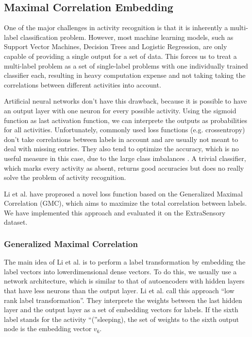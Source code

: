\subsection{Maximal Correlation Embedding}

One of the major challenges in activity recognition is that it is inherently a multi-label classification problem. However, most machine learning models, such as Support Vector Machines, Decision Trees and Logistic Regression, are only capable of providing a single output for a set of data. This forces us to treat a multi-label problem as a set of single-label problems with one individually trained classifier each, resulting in heavy computation expense and not taking taking the correlations between different activities into account.

Artificial neural networks don't have this drawback, because it is possible to have an output layer with one neuron for every possible activity. Using the sigmoid function as last activation function, we can interprete the outputs as probabilities for all activities. Unfortunately, commonly used loss functions (e.g. crossentropy) don't take correlations between labels in account and are usually not meant to deal with missing entries. They also tend to optimize the accuracy, which is no useful measure in this case, due to the large class imbalances \cite{Vaizman17}. A trivial classifier, which marks every activity as absent, returns good accuracies but does no really solve the problem of activity recognition.

Li et al. \cite{Li19} have proprosed a novel loss function based on the Generalized Maximal Correlation (GMC), which aims to maximize the total correlation between labels. We have implemented this approach and evaluated it on the ExtraSensory dataset.

\subsubsection{Generalized Maximal Correlation}

The main idea of Li et al. \cite{li2019} is to perform a label transformation by embedding the label vectors into lowerdimensional dense vectors. To do this, we usually use a network architecture, which is similar to that of autoencoders with hidden layers that have less neurons than the output layer. Li et al. call this approach \enquote{low rank label transformation}. They interprete the weights between the last hidden layer and the output layer as a set of embedding vectors for labels. If the sixth label stands for the activity \enquote(sleeping), the set of weights to the sixth output node is the embedding vector $v_6$.

